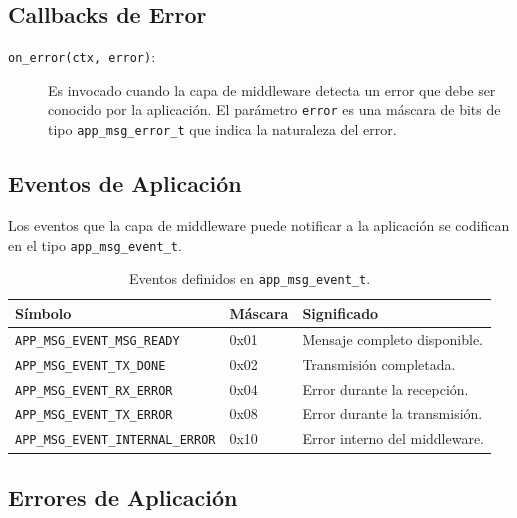\subsection{Callbacks de Error}
\label{subsec:app-error}

\begin{description}
    \item[\texttt{on\_error(ctx, error)}:] Es invocado cuando la capa de middleware detecta un error que debe ser conocido por la aplicación. El parámetro \texttt{error} es una máscara de bits de tipo \texttt{app\_msg\_error\_t} que indica la naturaleza del error.
\end{description}

\subsection{Eventos de Aplicación}
\label{subsec:app-eventos}

Los eventos que la capa de middleware puede notificar a la aplicación se codifican en el tipo \texttt{app\_msg\_event\_t}.

\begin{table}[htbp]
    \centering
    \caption{Eventos definidos en \texttt{app\_msg\_event\_t}.}
    \label{tab:app-msg-event}
    \begin{tabular}{llp{7cm}}
        \toprule
        \textbf{Símbolo} & \textbf{Máscara} & \textbf{Significado} \\
        \midrule
        \texttt{APP\_MSG\_EVENT\_MSG\_READY}      & 0x01 & Mensaje completo disponible. \\
        \texttt{APP\_MSG\_EVENT\_TX\_DONE}        & 0x02 & Transmisión completada. \\
        \texttt{APP\_MSG\_EVENT\_RX\_ERROR}       & 0x04 & Error durante la recepción. \\
        \texttt{APP\_MSG\_EVENT\_TX\_ERROR}       & 0x08 & Error durante la transmisión. \\
        \texttt{APP\_MSG\_EVENT\_INTERNAL\_ERROR} & 0x10 & Error interno del middleware. \\
        \bottomrule
    \end{tabular}
\end{table}

\subsection{Errores de Aplicación}
\label{subsec:app-errores}

